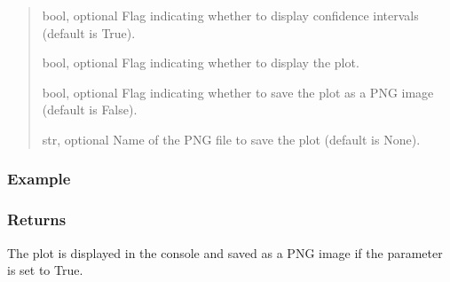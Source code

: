 \documentclass[a4paper,11pt,openany,english]{sphinxmanual}
\begin{document}
\begin{fulllineitems}
\begin{fulllineitems}
\begin{quote}
\begin{description}
\sphinxAtStartPar
bool, optional
Flag indicating whether to display confidence intervals (default is True).

\sphinxAtStartPar
bool, optional
Flag indicating whether to display the plot.

\sphinxAtStartPar
bool, optional
Flag indicating whether to save the plot as a PNG image (default is False).

\sphinxAtStartPar
str, optional
Name of the PNG file to save the plot (default is None).

\end{description}\end{quote}


\subsubsection{Example}
\label{\detokenize{api_topt:id42}}
\begin{sphinxVerbatim}[commandchars=\\\{\}]
  
 
   
\end{sphinxVerbatim}


\subsubsection{Returns}
\label{\detokenize{api_topt:id43}}\begin{description}
\sphinxAtStartPar
The plot is displayed in the console and saved as a PNG image if the  parameter is set to True.

\end{description}

\end{fulllineitems}


\end{fulllineitems}
\end{document}
